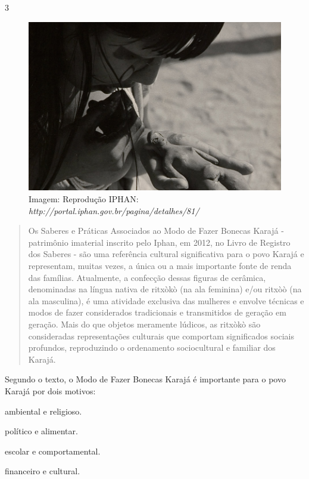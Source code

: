 \num{3}

\begin{figure}[htpb!]
\includegraphics[width=.5\textwidth]{./imgs/img44.png}
\caption{Imagem: Reprodução IPHAN: \emph{http://portal.iphan.gov.br/pagina/detalhes/81/}}
\end{figure}

\begin{quote}
Os Saberes e Práticas Associados ao Modo de Fazer Bonecas Karajá -
patrimônio imaterial inscrito pelo Iphan, em 2012, no Livro de Registro
dos Saberes - são uma referência cultural significativa para o povo
Karajá e representam, muitas vezes, a única ou a mais importante fonte
de renda das famílias. Atualmente, a confecção dessas figuras de
cerâmica, denominadas na língua nativa de ritxòkò (na ala feminina) e/ou
ritxòò (na ala masculina), é uma atividade exclusiva das mulheres e
envolve técnicas e modos de fazer considerados tradicionais e
transmitidos de geração em geração. Mais do que objetos meramente
lúdicos, as ritxòkò são consideradas representações culturais que
comportam significados sociais profundos, reproduzindo o ordenamento
sociocultural e familiar dos Karajá.
\end{quote}

Segundo o texto, o Modo de Fazer Bonecas Karajá é importante para o povo
Karajá por dois motivos:

\begin{escolha}
\item ambiental e religioso.

\item político e alimentar.

\item escolar e comportamental.

\item financeiro e cultural.
\end{escolha}


